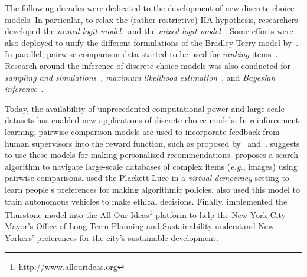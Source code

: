 The following decades were dedicated to the development of new discrete-choice models.
In particular, to relax the (rather restrictive) IIA hypothesis, researchers developed the \emph{nested logit model}~\citep{ben1973structure,williams1977formation,mcfadden1978modelling} and the \emph{mixed logit model}~\citep{boyd1980effect,cardell1980measuring,hensher2003mixed}.
Some efforts were also deployed to unify the different formulations of the Bradley-Terry model by~\citet{yellot1977relationship}.
In parallel, pairwise-comparison data started to be used for \emph{ranking} items~\citep{ford1957solution,buehlmann1963pairwise,plackett1975analysis,wauthier2013efficient,negahban2017rank}.
Research around the inference of discrete-choice models was also conducted for \emph{sampling and simulations}~\citep{manski1981alternative,cosslett1981efficient}, \emph{maximum likelihood estimation}~\citep{hastie1998classification,hunter2004mm,maystre2015fast,vojnovic2016parameter}, and \emph{Bayesian inference}~\citep{guiver2009bayesian,caron2012efficient,houlsby2012collaborative}.

Today, the availability of unprecedented computational power and large-scale datasets has enabled new applications of discrete-choice models.
In reinforcement learning, pairwise comparison models are used to incorporate feedback from human supervisors into the reward function, such as proposed by~\citet{sadigh2017active} and~\citet{christiano2017deep}.
\citet{ammar2015ranked} suggests to use these models for making personalized recommendations.
\citet{chumbalov2020scalable} proposes a search algorithm to navigate large-scale databases of complex items (\textit{e.g.}, images) using pairwise comparisons.
\citet{lee2019webuildai} used the Plackett-Luce in a \emph{virtual democracy} setting to learn people's preferences for making algorithmic policies.
\citet{noothigattu2018voting} also used this model to train autonomous vehicles to make ethical decisions.
Finally, \citet{salganik2015wiki} implemented the Thurstone model into the All Our Ideas\footnote{\href{http://www.allourideas.org/planyc_example?guides=true}{http://www.allourideas.org}} platform to help the New York City Mayor’s Office of Long-Term Planning and Sustainability understand New Yorkers' preferences for the city's sustainable development.

